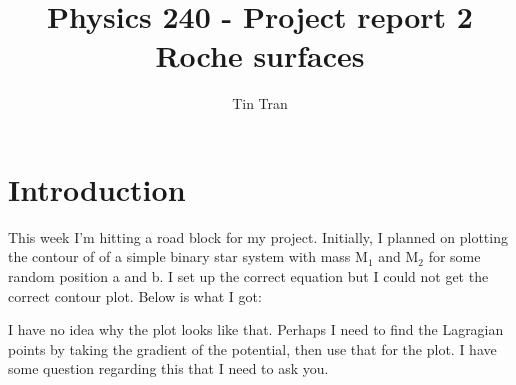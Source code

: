 \documentclass{article}
\begin{document}
\title{Physics 240 - Project report 2\\
		Roche surfaces}
\author{Tin Tran}

\maketitle

\section{Introduction}
This week I'm hitting a road block for my project. Initially, I planned on plotting the contour of of a simple binary star system with mass M$_1$ and M$_2$ for some random position a and b. I set up the correct equation but I could not get the correct contour plot. Below is what I got:

\begin{figure}[H]
\end{figure}
I have no idea why the plot looks like that. Perhaps I need to find the Lagragian points by taking the gradient of the potential, then use that for the plot. I have some question regarding this that I need to ask you.
\end{document}
